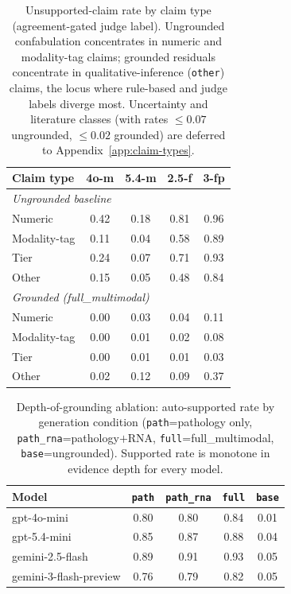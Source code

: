 \documentclass{article}
\theoremstyle{plain}
\begin{document}
\begin{table}[!t]
\centering
\small
\setlength{\tabcolsep}{4pt}
\begin{tabular}{lcccc}
\toprule
\textbf{Claim type} & \textbf{4o-m} & \textbf{5.4-m} & \textbf{2.5-f} & \textbf{3-fp} \\
\midrule
\multicolumn{5}{l}{\emph{Ungrounded baseline}} \\
Numeric        & 0.42 & 0.18 & 0.81 & 0.96 \\
Modality-tag   & 0.11 & 0.04 & 0.58 & 0.89 \\
Tier           & 0.24 & 0.07 & 0.71 & 0.93 \\
Other          & 0.15 & 0.05 & 0.48 & 0.84 \\
\midrule
\multicolumn{5}{l}{\emph{Grounded (full\_multimodal)}} \\
Numeric        & 0.00 & 0.03 & 0.04 & 0.11 \\
Modality-tag   & 0.00 & 0.01 & 0.02 & 0.08 \\
Tier           & 0.00 & 0.01 & 0.01 & 0.03 \\
Other          & 0.02 & 0.12 & 0.09 & 0.37 \\
\bottomrule
\end{tabular}
\caption{Unsupported-claim rate by claim type (agreement-gated judge label). Ungrounded confabulation concentrates in numeric and modality-tag claims; grounded residuals concentrate in qualitative-inference (\texttt{other}) claims, the locus where rule-based and judge labels diverge most. Uncertainty and literature classes (with rates $\leq 0.07$ ungrounded, $\leq 0.02$ grounded) are deferred to Appendix~\ref{app:claim-types}.}
\label{tab:ctypes}
\end{table}

\begin{table}[!t]
\centering
\small
\setlength{\tabcolsep}{4pt}
\begin{tabular}{lcccc}
\toprule
\textbf{Model} & \texttt{path} & \texttt{path\_rna} & \texttt{full} & \texttt{base} \\
\midrule
gpt-4o-mini             & 0.80 & 0.80 & 0.84 & 0.01 \\
gpt-5.4-mini            & 0.85 & 0.87 & 0.88 & 0.04 \\
gemini-2.5-flash        & 0.89 & 0.91 & 0.93 & 0.05 \\
gemini-3-flash-preview  & 0.76 & 0.79 & 0.82 & 0.05 \\
\bottomrule
\end{tabular}
\caption{Depth-of-grounding ablation: auto-supported rate by generation condition (\texttt{path}=pathology only, \texttt{path\_rna}=pathology$+$RNA, \texttt{full}=full\_multimodal, \texttt{base}=ungrounded). Supported rate is monotone in evidence depth for every model.}
\label{tab:gradient}
\end{table}
\end{document}
